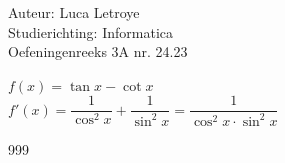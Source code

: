 \documentclass[a4paper]{article}
\begin{document}
  
\noindent \large Auteur: Luca Letroye        \\
\noindent \large Studierichting: Informatica \\
\noindent \large Oefeningenreeks 3A nr. 24.23 \\

\medskip

\normalsize

$f(x) = \tan x - \cot x$\\

$f'(x) = \dfrac{1}{\cos^2 x} + \dfrac{1}{\sin^2 x} = \dfrac{1}{\cos^2 x \cdot \sin^2 x}$


\begin{thebibliography}{999}
\end{thebibliography}
\end{document}
